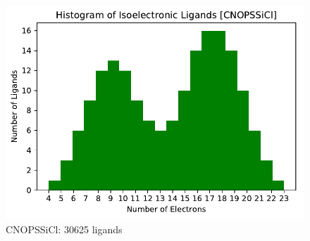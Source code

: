 \documentclass{beamer}
\begin{document}
\begin{frame}
\begin{figure}[ht]
\begin{minipage}[b]{0.5\linewidth}
		\centering
		\includegraphics[width=.5\linewidth]{img/hist_iso_ligands_CNOPSSiCl.pdf} 
		\caption{CNOPSSiCl: 30625 ligands} 
		\vspace{4ex}
	\end{minipage} 
\end{figure}
\end{frame}

\end{document}
